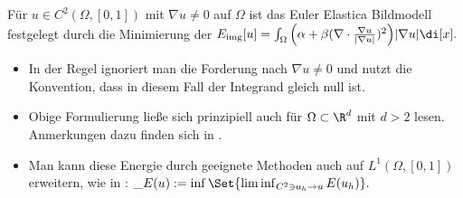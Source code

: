 \documentclass{mythesis}
\begin{document}
\begin{definition}
    Für $u \in C^2(\Omega, [0,1])$ mit $\nabla u \neq 0$ auf $\Omega$ ist das Euler Elastica Bildmodell festgelegt durch die Minimierung der 
    \begin{math}
	\Eimg[u] = \int_\Omega \Big(\alpha + \beta (\nabla \cdot \frac{\nabla u}{|\nabla u|})^2\Big)|\nabla u| \di[x].
    \end{math}
    \begin{note}
	\begin{itemize}
	    \item
		In der Regel ignoriert man die Forderung nach $\nabla u \neq 0$ und nutzt die Konvention, dass in diesem Fall der Integrand gleich null ist.
	    \item
		Obige Formulierung ließe sich prinzipiell auch für $\Omega \subset \R^d$ mit $d > 2$ lesen.
		Anmerkungen dazu finden sich in \cite{ambrosio2003direct}.
	    \item
		Man kann diese Energie durch geeignete Methoden auch auf $L^1(\Omega, [0,1])$ erweitern, wie in \cite{ambrosio2003direct}:
		\begin{math}
		    \_E(u) := \inf \Set{ \liminf_{C^2 \ni u_h \to u} E(u_h) }.
		\end{math}
	\end{itemize}
    \end{note}
\end{definition}
\end{document}
